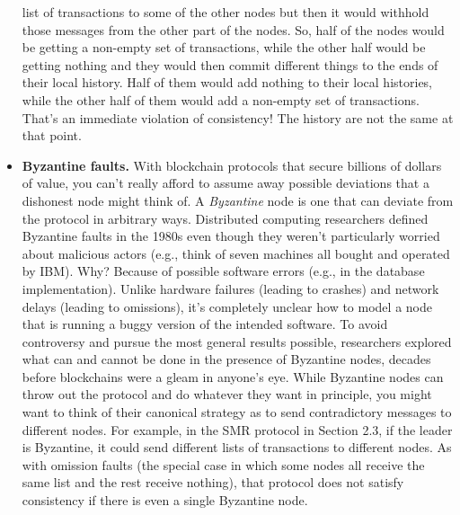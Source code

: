 \begin{itemize}
list of transactions to some of the other nodes but then it would withhold those messages from the other part of
the nodes. So, half of the nodes would be getting a non-empty set of transactions, while the other half would be getting nothing
and they would then commit different things to the ends of their local history. Half of them would add nothing
to their local histories, while the other half of them would add a non-empty set of transactions. That's an immediate violation of consistency! The history
are not the same at that point.
    \item \textbf{Byzantine faults.} With blockchain protocols that secure billions of dollars of value, you
can't really afford to assume away possible deviations that a dishonest node might think of.
A \textit{Byzantine} node is one that can deviate from the protocol in arbitrary ways. Distributed
computing researchers defined Byzantine faults in the 1980s even though they weren’t particularly worried about malicious actors (e.g., think of seven machines all bought and operated
by IBM). Why? Because of possible software errors (e.g., in the database implementation).
Unlike hardware failures (leading to crashes) and network delays (leading to omissions), it’s
completely unclear how to model a node that is running a buggy version of the intended
software. To avoid controversy and pursue the most general results possible, researchers
explored what can and cannot be done in the presence of Byzantine nodes, decades before
blockchains were a gleam in anyone’s eye.
While Byzantine nodes can throw out the protocol and do whatever they
want in principle, you might want to think of their canonical strategy as to send contradictory messages
to different nodes. For example, in the SMR protocol in Section 2.3, if the leader is Byzantine,
it could send different lists of transactions to different nodes. As with omission faults (the
special case in which some nodes all receive the same list and the rest receive nothing), that
protocol does not satisfy consistency if there is even a single Byzantine node.\\
\end{itemize}



